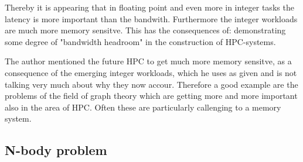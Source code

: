 \documentclass[a4paper,11pt]{scrartcl}
\begin{document}
Thereby it is appearing that in floating point and even more in integer tasks the 
latency is more important than the bandwith. Furthermore the integer workloads are much more memory sensitve. This has the consequences of: demonstrating some degree of "bandwidth headroom" in the construction of HPC-systems.

The author mentioned the future HPC to get much more memory sensitve, as a consequence of the emerging integer workloads, which he uses as given and is not talking very much about why they now accour. Therefore a good example are the problems of the field of graph theory which are getting more and more important also in the area of HPC. Often these are particularly callenging to a memory system. 


\subsection{N-body problem}
\end{document}

